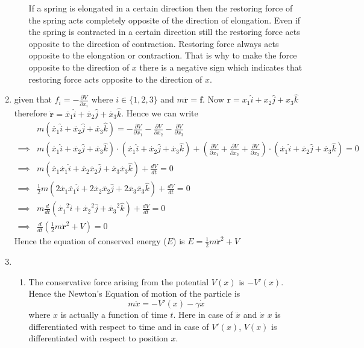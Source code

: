 \documentclass{article}
\newcommand{\bmr}{\boldsymbol{r}}
\newcommand{\bmf}{\boldsymbol{f}}
\begin{document}
\begin{enumerate}
\begin{enumerate}
\hspace{1cm}If a spring is elongated in a certain direction then the restoring force of the spring acts completely opposite of the direction of elongation. Even if the spring is contracted in a certain direction still the restoring force acts opposite to the direction of contraction. Restoring force always acts opposite to the elongation or contraction. That is why to make the force opposite to the direction of $x$ there is a negative sign which indicates that restoring force acts opposite to the direction of $x$.
	\end{enumerate}
\item given that $f_i=-\frac{\partial V }{\partial x_i}$ where $i\in\{1,2,3\}$ and $m\ddot{\bmr}=\bmf$. Now $\bmr=x_1\hat{i}+x_2\hat{j}+x_3\hat{k}$ therefore $\ddot{\bmr}=\ddot{x_1}\hat{i}+\ddot{x_2}\hat{j}+\ddot{x_3}\hat{k}$. Hence we can write\begin{align*}
	&m\left( \ddot{x_1}\hat{i}+\ddot{x_2}\hat{j}+\ddot{x_3}\hat{k}\right) =-\frac{\partial V }{\partial x_1}-\frac{\partial V }{\partial x_2}-\frac{\partial V }{\partial x_3}\\
	\implies & m(\ddot{x_1}\hat{i}+\ddot{x_2}\hat{j}+\ddot{x_3}\hat{k})\cdot (\dot{x_1}\hat{i}+\dot{x_2}\hat{j}+\dot{x_3}\hat{k})+\left(\frac{\partial V }{\partial x_1}+\frac{\partial V }{\partial x_2}+\frac{\partial V }{\partial x_3} \right) \cdot (\dot{x_1}\hat{i}+\dot{x_2}\hat{j}+\dot{x_3}\hat{k})=0\\
	\implies &m (\ddot{x_1}\dot{x_1}\hat{i}+\ddot{x_2}\dot{x_2}\hat{j}+\ddot{x_3}\dot{x_3}\hat{k})+\frac{d V}{d t}=0\\
	\implies &\frac12 m(2\dot{x_1}\ddot{x_1}\hat{i}+2\dot{x_2}\ddot{x_2}\hat{j}+2\dot{x_3}\ddot{x_3}\hat{k})+\frac{d V}{d t}=0\\
	\implies & m \frac{d }{d t}\left(\dot{x_1}^2\hat{i}+\dot{x_2}^2\hat{j}+\dot{x_3}^2\hat{k} \right) +\frac{d V}{d t}=0\\
	\implies &\frac{d }{d t}\left( \frac12m\dot{\bmr}^2+V\right)=0 
\end{align*}Hence the equation of conserved energy ($E$) is $E=\frac12 m\dot{\bmr}^2+V$
\item \begin{enumerate}
	\item The conservative force arising from the potential $V(x)$ is $-V'(x)$. Hence the Newton's Equation of motion of the particle is \begin{equation}
		m\ddot{x}=-V'(x)-\gamma \dot{x}\label{e1}
	\end{equation} where $x$ is actually a function of time $t$. Here in case of $\ddot{x}$ and $\dot{x}$ $x$ is differentiated with respect to time and in case of $V'(x)$, $V(x)$ is differentiated with respect to position $x$. 

\end{enumerate}
\end{enumerate}
\end{document}
